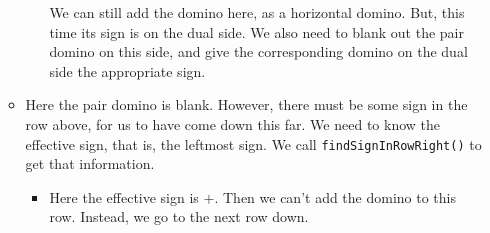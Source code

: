 \documentclass[12pt]{article}
\numberwithin{equation}{section}
\newcommand{\verticalDominoMaybeShift}[4]{\filldraw [dominoMaybeStyle] (#2 - 1 + #4 + \eps,  #1 - 1 + \eps) rectangle + (1 - \teps,2 -\teps) node [dominoText] {$#3$};}
\begin{document}
\begin{itemize}
\begin{itemize}
\begin{itemize}
\begin{figure}[H]
        \end{figure}
        We can still add the domino here, as a horizontal domino.
        But, this time its sign is on the dual side.
        We also need to blank out the pair domino on this side, and give the corresponding domino on the dual side the appropriate sign.
        \begin{figure}[H]
          \centering
        \end{figure}
      \end{itemize}
      \item Here the pair domino is blank.
      However, there must be some sign in the row above, for us to have come down this far.
      We need to know the effective sign, that is, the leftmost sign.
      We call \texttt{findSignInRowRight()} to get that information.
      \begin{itemize}
        \item Here the effective sign is $+$.
        Then we can't add the domino to this row.
        Instead, we go to the next row down.

\end{itemize}
\end{itemize}
\end{itemize}
\end{document}
